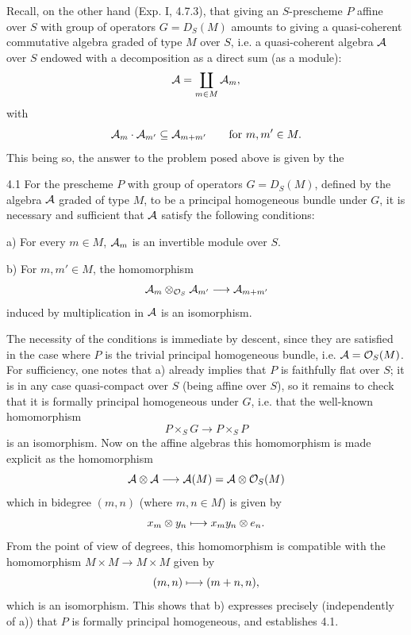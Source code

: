 Recall, on the other hand (Exp. I, 4.7.3), that giving an $S$-prescheme $P$ affine over $S$ with group of operators $G=D_S(M)$ amounts to giving a quasi-coherent commutative algebra graded of type $M$ over $S$, i.e. a quasi-coherent algebra $\cal A$ over $S$ endowed with a decomposition as a direct sum (as a module):
\[
\cal A=\coprod_{m\in M}\cal A_m,
\]
with
\[
\cal A_m\cdot\cal A_{m'}\subseteq\cal A_{m+m'}\qquad\text{for }m,m'\in M.
\]
This being so, the answer to the problem posed above is given by the
\begin{proposition}{4.1}\label{VIII.4.1}
For the prescheme $P$ with group of operators $G=D_S(M)$, defined by the algebra $\cal A$ graded of type $M$, to be a principal homogeneous bundle under $G$, it is necessary and sufficient that $\cal A$ satisfy the following conditions:

a) For every $m\in M$, $\cal A_m$ is an invertible module over $S$.

b) For $m,m'\in M$, the homomorphism
\[
\cal A_m\otimes_{\OS}\cal A_{m'}\to\cal A_{m+m'}
\]
induced by multiplication in $\cal A$ is an isomorphism.
\end{proposition}
The necessity of the conditions is immediate by descent, since they are satisfied in the case where $P$ is the trivial principal homogeneous bundle, i.e. $\cal A=\OS(M)$. For sufficiency, one notes that a) already implies that $P$ is faithfully flat over $S$; it is in any case quasi-compact over $S$ (being affine over $S$), so it remains to check that it is formally principal homogeneous under $G$, i.e. that the well-known homomorphism
\[
P\times_S G\to P\times_S P
\]
is an isomorphism. Now on the affine algebras this homomorphism is made explicit as the homomorphism
\[
\cal A\otimes\cal A\to\cal A(M)=\cal A\otimes\OS(M)
\]
which in bidegree $(m,n)$ (where $m,n\in M$) is given by
\[
x_m\otimes y_n\mto x_my_n\otimes e_n.
\]
From the point of view of degrees, this homomorphism is compatible with the homomorphism $M\times M\to M\times M$ given by
\[
(m,n)\mto(m+n,n),
\]
which is an isomorphism. This shows that b) expresses precisely (independently of a)) that $P$ is formally principal homogeneous, and establishes 4.1.

